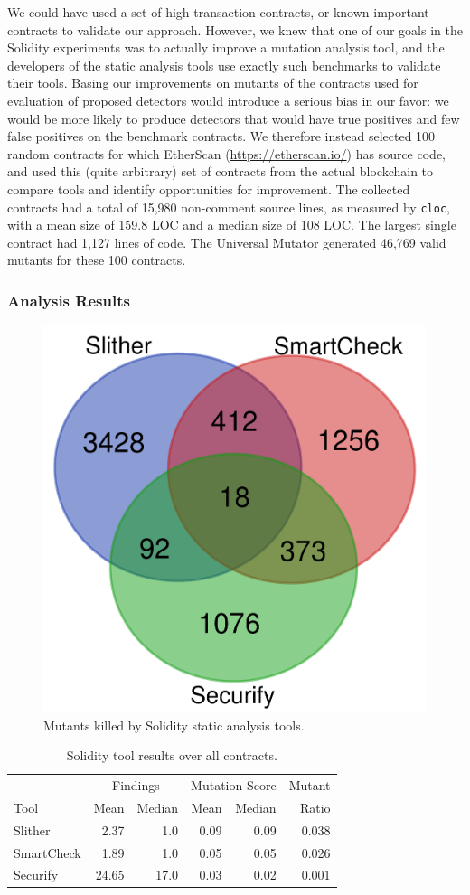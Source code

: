 We could have used a set of high-transaction contracts, or known-important contracts to validate our approach.  However, we knew that one of our goals in the Solidity experiments was to actually improve a mutation analysis tool, and the developers of the static analysis tools use exactly such benchmarks to validate their tools.  Basing our improvements on mutants of the contracts used for evaluation of proposed detectors would introduce a serious bias in our favor: we would be more likely to produce detectors that would have true positives and few false positives on the benchmark contracts.  We therefore instead selected 100 random contracts for which EtherScan (\url{https://etherscan.io/}) has source code, and used this (quite arbitrary) set of contracts from the actual blockchain to compare tools and identify opportunities for improvement.  The collected contracts had a total of 15,980 non-comment source lines, as measured by {\tt cloc}, with a mean size of 159.8 LOC and a median size of 108 LOC.  The largest single contract had 1,127 lines of code.  The Universal Mutator generated 46,769 valid mutants for these 100 contracts.

\subsubsection{Analysis Results}

\begin{figure}
  \includegraphics[width=0.6\columnwidth]{solidity.png}
  \caption{Mutants killed by Solidity static analysis tools.}
  \label{fig:solidityvenn}
\end{figure}

\begin{table}
  \begin{tabular}{l|r|r|r|r|r}
    & \multicolumn{2}{|c|}{Findings} & \multicolumn{2}{|c|}{Mutation Score}  & Mutant \\
    Tool & Mean & Median & Mean & Median & Ratio\\
    \hline
    \hline
    Slither & 2.37 & 1.0 & 0.09 & 0.09 & 0.038 \\
    \hline
    SmartCheck & 1.89 & 1.0 & 0.05 & 0.05 & 0.026 \\
    \hline
    Securify & 24.65 & 17.0 & 0.03 & 0.02 &  0.001 \\
    \hline
  \end{tabular}
  \caption{Solidity tool results over all contracts.}
  \label{tab:scoresolidity}
\end{table}

